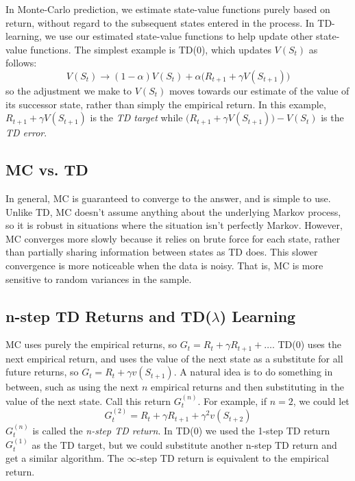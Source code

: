 \documentclass{article}
\newcommand{\ita}{\textit}
\begin{document}
In Monte-Carlo prediction, we estimate state-value functions purely based on return, without regard to the subsequent states entered in the process. In TD-learning, we use our estimated state-value functions to help update other state-value functions. The simplest example is TD(0), which updates $V(S_t)$ as follows:
\begin{equation}\label{eq:td0_update}
V(S_t) \rightarrow (1-\alpha)V(S_t) + \alpha \bigg(R_{t+1} + \gamma V(S_{t+1})\bigg)
\end{equation}
so the adjustment we make to $V(S_t)$ moves towards our estimate of the value of its successor state, rather than simply the empirical return. In this example, $R_{t+1} + \gamma V(S_{t+1})$ is the \ita{TD target} while $\bigg(R_{t+1} + \gamma V(S_{t+1})\bigg) - V(S_t)$ is the \ita{TD error}.

\subsection{MC vs. TD}

In general, MC is guaranteed to converge to the answer, and is simple to use. Unlike TD, MC doesn't assume anything about the underlying Markov process, so it is robust in situations where the situation isn't perfectly Markov. However, MC converges more slowly because it relies on brute force for each state, rather than partially sharing information between states as TD does. This slower convergence is more noticeable when the data is noisy. That is, MC is more sensitive to random variances in the sample.

\subsection{n-step TD Returns and TD($\lambda$) Learning}

MC uses purely the empirical returns, so $G_t = R_t + \gamma R_{t+1} + \ldots$. TD(0) uses the next empirical return, and uses the value of the next state as a substitute for all future returns, so $G_t = R_t + \gamma v(S_{t+1})$. A natural idea is to do something in between, such as using the next $n$ empirical returns and then substituting in the value of the next state. Call this return $G^{(n)}_t$. For example, if $n = 2$, we could let
\begin{equation}\label{eq:2_step_td_return}
G^{(2)}_t = R_t + \gamma R_{t+1} + \gamma^2 v(S_{t+2})
\end{equation}
$G^{(n)}_t$ is called the \ita{n-step TD return}. In TD(0) we used the 1-step TD return $G^{(1)}_t$ as the TD target, but we could substitute another n-step TD return and get a similar algorithm. The $\infty$-step TD return is equivalent to the empirical return.
\end{document}
